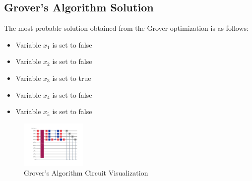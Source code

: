 \documentclass{article}%
\begin{document}
%
\subsection{Grover's Algorithm Solution}%
\label{subsec:GroversAlgorithmSolution}%
The most probable solution obtained from the Grover optimization is as follows:\newline%
%
\begin{itemize}%
\item Variable \( x_1 \) is set to false%
\item Variable \( x_2 \) is set to false%
\item Variable \( x_3 \) is set to true%
\item Variable \( x_4 \) is set to false%
\item Variable \( x_5 \) is set to false%
\end{itemize}

%


\begin{figure}[h!]%
\centering%
\includegraphics[width=120px]{quantum_circuit_grover.png}%
\caption{Grover's Algorithm Circuit Visualization}%
\end{figure}

%
\end{document}
